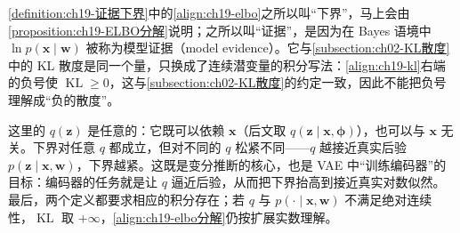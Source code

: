 \documentclass[../../main.tex]{subfiles}
\begin{document}
\begin{remark}
\cref{definition:ch19-证据下界}中的\eqref{align:ch19-elbo}之所以叫“下界”，马上会由\cref{proposition:ch19-ELBO分解}说明；之所以叫“证据”，是因为在 Bayes 语境中 $\ln p(\bm{x}\mid\bm{w})$ 被称为模型证据（model evidence）。它与\cref{subsection:ch02-KL散度}中的 KL 散度是同一个量，只换成了连续潜变量的积分写法：\eqref{align:ch19-kl}右端的负号使 $\operatorname{KL}\geqslant0$，这与\cref{subsection:ch02-KL散度}的约定一致，因此不能把负号理解成“负的散度”。

这里的 $q(\bm{z})$ 是任意的：它既可以依赖 $\bm{x}$（后文取 $q(\bm{z}\mid\bm{x},\bm{\phi})$），也可以与 $\bm{x}$ 无关。下界对任意 $q$ 都成立，但对不同的 $q$ 松紧不同——$q$ 越接近真实后验 $p(\bm{z}\mid\bm{x},\bm{w})$，下界越紧。这既是变分推断的核心，也是 VAE 中“训练编码器”的目标：编码器的任务就是让 $q$ 逼近后验，从而把下界抬高到接近真实对数似然。最后，两个定义都要求相应的积分存在；若 $q$ 与 $p(\cdot\mid\bm{x},\bm{w})$ 不满足绝对连续性，$\operatorname{KL}$ 取 $+\infty$，\eqref{align:ch19-elbo分解}仍按扩展实数理解。
\end{remark}
\end{document}
